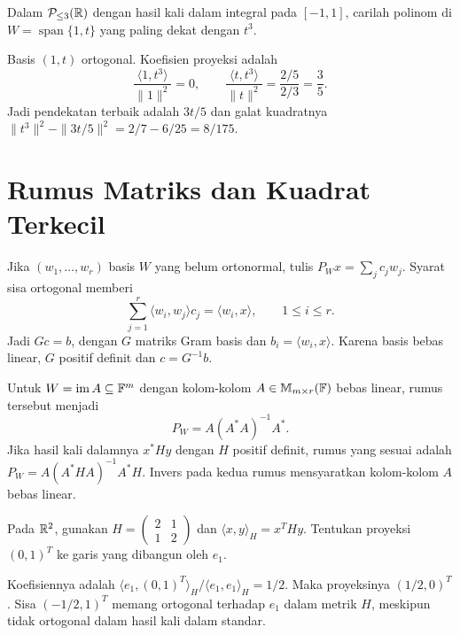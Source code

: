 \begin{exam}
    Dalam $\mathcal P_{\le3}(\mathbb{R})$ dengan hasil kali dalam integral
    pada $[-1,1]$, carilah polinom di $W=\operatorname{span}\{1,t\}$
    yang paling dekat dengan $t^3$.
\end{exam}
\begin{solution}
    Basis $(1,t)$ ortogonal. Koefisien proyeksi adalah
    \[
        \frac{\langle1,t^3\rangle}{\|1\|^2}=0,\qquad
        \frac{\langle t,t^3\rangle}{\|t\|^2}
          =\frac{2/5}{2/3}=\frac35.
    \]
    Jadi pendekatan terbaik adalah $3t/5$ dan galat kuadratnya
    $\|t^3\|^2-\|3t/5\|^2=2/7-6/25=8/175$.
\end{solution}

\section{Rumus Matriks dan Kuadrat Terkecil}

Jika $(w_1,\ldots,w_r)$ basis $W$ yang belum ortonormal,
tulis $P_Wx=\sum_jc_jw_j$. Syarat sisa ortogonal memberi
\[
    \sum_{j=1}^r\langle w_i,w_j\rangle c_j=\langle w_i,x\rangle,
    \qquad 1\le i\le r.
\]
Jadi $Gc=b$, dengan $G$ matriks Gram basis dan
$b_i=\langle w_i,x\rangle$. Karena basis bebas linear, $G$
positif definit dan $c=G^{-1}b$.

Untuk $W=\operatorname{im}A\subseteq\mathbb{F}^m$ dengan kolom-kolom
$A\in\mathbb{M}_{m\times r}(\mathbb{F})$ bebas linear, rumus tersebut menjadi
\[
    P_W=A(A^*A)^{-1}A^*.
\]
Jika hasil kali dalamnya $x^*Hy$ dengan $H$ positif definit,
rumus yang sesuai adalah $P_W=A(A^*HA)^{-1}A^*H$.
Invers pada kedua rumus mensyaratkan kolom-kolom $A$ bebas linear.

\begin{exam}
    Pada $\mathbb{R}^2$, gunakan $H=\begin{pmatrix}2&1\\1&2\end{pmatrix}$
    dan $\langle x,y\rangle_H=x^THy$.
    Tentukan proyeksi $(0,1)^T$ ke garis yang dibangun oleh $e_1$.
\end{exam}
\begin{solution}
    Koefisiennya adalah
    $\langle e_1,(0,1)^T\rangle_H/\langle e_1,e_1\rangle_H=1/2$.
    Maka proyeksinya $(1/2,0)^T$.
    Sisa $(-1/2,1)^T$ memang ortogonal terhadap $e_1$ dalam
    metrik $H$, meskipun tidak ortogonal dalam hasil kali dalam standar.
\end{solution}

